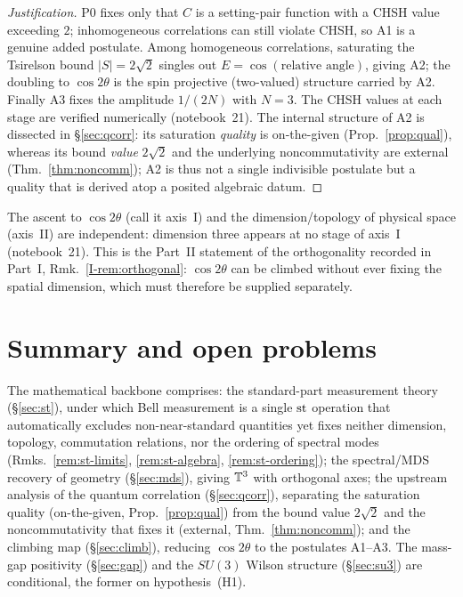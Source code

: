 \documentclass[11pt]{article}
\begin{document}
\begin{proof}[Justification]
P0 fixes only that $C$ is a setting-pair function with a CHSH value exceeding $2$;
inhomogeneous correlations can still violate CHSH, so A1 is a genuine added postulate.
Among homogeneous correlations, saturating the Tsirelson bound $|S|=2\sqrt2$ singles out
$E=\cos(\text{relative angle})$, giving A2; the doubling to $\cos2\theta$ is the spin
projective (two-valued) structure carried by A2. Finally A3 fixes the amplitude $1/(2N)$
with $N=3$. The CHSH values at each stage are verified numerically (notebook~21). The
internal structure of A2 is dissected in \S\ref{sec:qcorr}: its saturation \emph{quality} is
on-the-given (Prop.~\ref{prop:qual}), whereas its bound \emph{value} $2\sqrt2$ and the
underlying noncommutativity are external (Thm.~\ref{thm:noncomm}); A2 is thus not a single
indivisible postulate but a quality that is derived atop a posited algebraic datum.
\end{proof}

\begin{remark}\label{rem:axes}
The ascent to $\cos2\theta$ (call it axis~I) and the dimension/topology of physical space
(axis~II) are independent: dimension three appears at no stage of axis~I (notebook~21).
This is the Part~II statement of the orthogonality recorded in Part~I,
Rmk.~\ref{I-rem:orthogonal}: $\cos2\theta$ can be climbed without ever fixing the spatial
dimension, which must therefore be supplied separately.
\end{remark}

\section{Summary and open problems}\label{sec:math-summary}
The mathematical backbone comprises: the standard-part measurement theory
(\S\ref{sec:st}), under which Bell measurement is a single $\operatorname{st}$ operation that
automatically excludes non-near-standard quantities yet fixes neither dimension, topology,
commutation relations, nor the ordering of spectral modes
(Rmks.~\ref{rem:st-limits}, \ref{rem:st-algebra}, \ref{rem:st-ordering}); the spectral/MDS
recovery of geometry (\S\ref{sec:mds}), giving $\mathbb{T}^{3}$ with orthogonal axes; the
upstream analysis of the quantum correlation (\S\ref{sec:qcorr}), separating the saturation
quality (on-the-given, Prop.~\ref{prop:qual}) from the bound value $2\sqrt2$ and the
noncommutativity that fixes it (external, Thm.~\ref{thm:noncomm}); and the climbing map
(\S\ref{sec:climb}), reducing $\cos2\theta$ to the postulates A1--A3. The mass-gap positivity
(\S\ref{sec:gap}) and the $SU(3)$ Wilson structure (\S\ref{sec:su3}) are conditional, the
former on hypothesis~(H1).
\end{document}
